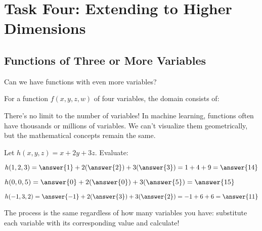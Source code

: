 \documentclass{ximera}
\begin{document}
\section*{Task Four: Extending to Higher Dimensions}

\subsection*{Functions of Three or More Variables}

\begin{problem}
Can we have functions with even more variables?

\begin{selectAll}
\end{selectAll}

For a function $f(x, y, z, w)$ of four variables, the domain consists of:
\begin{multipleChoice}
\end{multipleChoice}

\begin{feedback}
There's no limit to the number of variables! In machine learning, functions often have thousands or millions of variables. We can't visualize them geometrically, but the mathematical concepts remain the same.
\end{feedback}
\end{problem}

\begin{problem}
Let $h(x, y, z) = x + 2y + 3z$. Evaluate:

$h(1, 2, 3) = \answer{1} + 2(\answer{2}) + 3(\answer{3}) = 1 + 4 + 9 = \answer{14}$

$h(0, 0, 5) = \answer{0} + 2(\answer{0}) + 3(\answer{5}) = \answer{15}$

$h(-1, 3, 2) = \answer{-1} + 2(\answer{3}) + 3(\answer{2}) = -1 + 6 + 6 = \answer{11}$

\begin{feedback}
The process is the same regardless of how many variables you have: substitute each variable with its corresponding value and calculate!
\end{feedback}
\end{problem}
\end{document}
